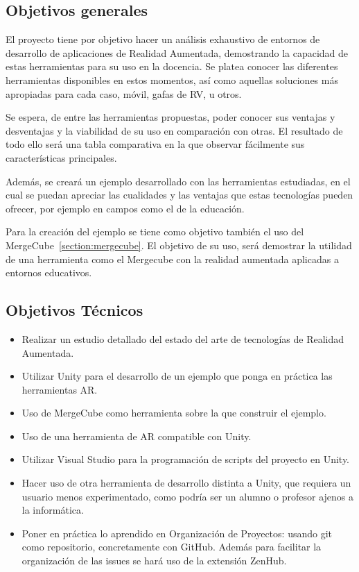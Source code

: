 
\subsection{Objetivos generales}
El proyecto tiene por objetivo hacer un análisis exhaustivo de entornos de desarrollo de aplicaciones de Realidad Aumentada, demostrando la capacidad de estas herramientas para su uso en la docencia. Se platea conocer las diferentes herramientas disponibles en estos momentos, así como aquellas soluciones más apropiadas para cada caso, móvil, gafas de RV, u otros.

Se espera, de entre las herramientas propuestas, poder conocer sus ventajas y desventajas y la viabilidad de su uso en comparación con otras. El resultado de todo ello será una tabla comparativa en la que observar fácilmente sus características principales.

Además, se creará un ejemplo desarrollado con las herramientas estudiadas, en el cual se puedan apreciar las cualidades y las ventajas que estas tecnologías pueden ofrecer, por ejemplo en campos como el de la educación.

Para la creación del ejemplo se tiene como objetivo también el uso del MergeCube~\ref{section:mergecube}. El objetivo de su uso, será demostrar la utilidad de una herramienta como el Mergecube con la realidad aumentada aplicadas a entornos educativos.

 

\subsection{Objetivos Técnicos}
\begin{itemize}
\item Realizar un estudio detallado del estado del arte de tecnologías de Realidad Aumentada. 	
\item Utilizar Unity para el desarrollo de un ejemplo que ponga en práctica las herramientas AR.
\item Uso de MergeCube como herramienta sobre la que construir el ejemplo.
\item Uso de una herramienta de AR compatible con Unity.
\item Utilizar Visual Studio para la programación de scripts del proyecto en Unity.
\item Hacer uso de otra herramienta de desarrollo distinta a Unity, que requiera un usuario menos experimentado, como podría ser un alumno o profesor ajenos a la informática.
\item Poner en práctica lo aprendido en Organización de Proyectos: usando git como repositorio, concretamente con GitHub. Además para facilitar la organización de las issues  se hará uso de la extensión ZenHub.

	
\end{itemize}


